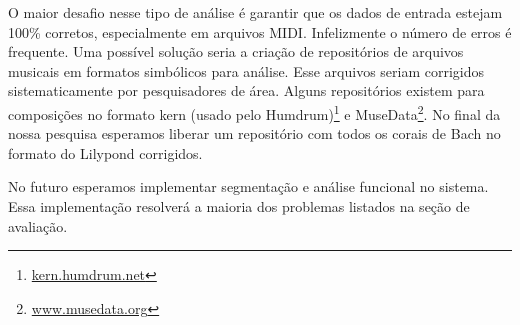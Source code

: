 O maior desafio nesse tipo de análise é garantir que os dados de
entrada estejam 100\% corretos, especialmente em arquivos MIDI.
Infelizmente o número de erros é frequente. Uma possível solução seria
a criação de repositórios de arquivos musicais em formatos simbólicos
para análise. Esse arquivos seriam corrigidos sistematicamente por
pesquisadores de área. Alguns repositórios existem para composições no
formato kern (usado pelo Humdrum)\footnote{\url{kern.humdrum.net}} e
MuseData\footnote{\url{www.musedata.org}}. No final da nossa pesquisa
esperamos liberar um repositório com todos os corais de Bach no
formato do Lilypond corrigidos.

No futuro esperamos implementar segmentação e análise funcional no
sistema. Essa implementação resolverá a maioria dos problemas listados
na seção de avaliação.


